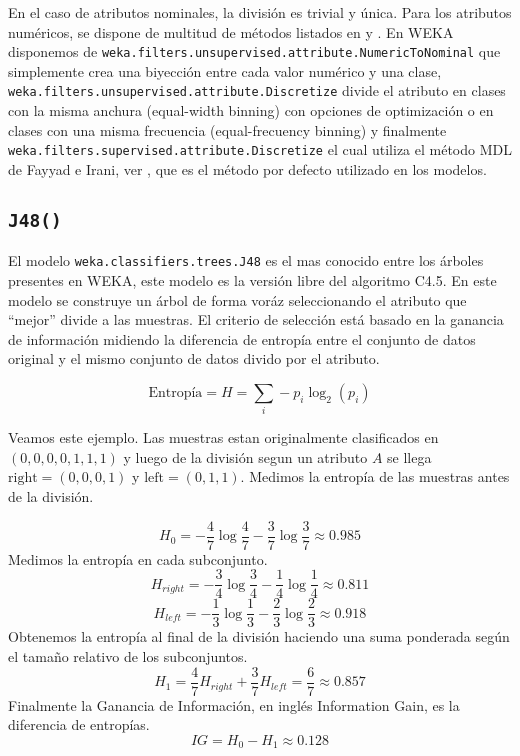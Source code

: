\documentclass[10pt,a4paper]{article}
\begin{document}
En el caso de atributos nominales, la división es trivial y única. Para los atributos numéricos, se dispone de multitud de métodos listados en \cite{kotsiantis2006discretization} y \cite{dougherty1995supervised}. En WEKA disponemos de \lstinline{weka.filters.unsupervised.attribute.NumericToNominal} que simplemente crea una biyección entre cada valor numérico y una clase, \lstinline{weka.filters.unsupervised.attribute.Discretize} divide el atributo en clases con la misma anchura (equal-width binning) con opciones de optimización o en clases con una misma frecuencia (equal-frecuency binning) y finalmente \lstinline{weka.filters.supervised.attribute.Discretize} el cual utiliza el método MDL de Fayyad e Irani, ver \cite{irani1993multi}, que es el método por defecto utilizado en los modelos.

\subsection{\lstinline{J48()}}
El modelo \lstinline{weka.classifiers.trees.J48} es el mas conocido entre los árboles presentes en WEKA, este modelo es la versión libre del algoritmo C4.5. En este modelo se construye un árbol de forma voráz seleccionando el atributo que ``mejor'' divide a las muestras. El criterio de selección está basado en la ganancia de información midiendo la diferencia de entropía entre el conjunto de datos original y el mismo conjunto de datos divido por el atributo.

\[
\text{Entropía} = H = \sum_i -p_i \log_2(p_i)
\]

Veamos este ejemplo. Las muestras estan originalmente clasificados en $(0, 0, 0, 0, 1, 1, 1)$ y luego de la división segun un atributo $A$ se llega $\text{right}=(0, 0, 0, 1)$ y $\text{left}=(0, 1, 1)$. Medimos la entropía de las muestras antes de la división.

\[
H_0 = -\frac{4}{7} \log\frac{4}{7} -\frac{3}{7} \log\frac{3}{7} \approx 0.985
\]
Medimos la entropía en cada subconjunto.
\[
H_{right} = -\frac{3}{4} \log\frac{3}{4} - \frac{1}{4} \log\frac{1}{4} \approx 0.811
\]
\[
H_{left} = -\frac{1}{3} \log\frac{1}{3} - \frac{2}{3} \log\frac{2}{3} \approx 0.918
\]
Obtenemos la entropía al final de la división haciendo una suma ponderada según el tamaño relativo de los subconjuntos.
\[
H_1 = \frac{4}{7}H_{right} + \frac{3}{7}H_{left} = \frac{6}{7} \approx 0.857
\]
Finalmente la Ganancia de Información, en inglés Information Gain, es la diferencia de entropías.
\[
IG = H_0 - H_1 \approx 0.128
\]
\end{document}

